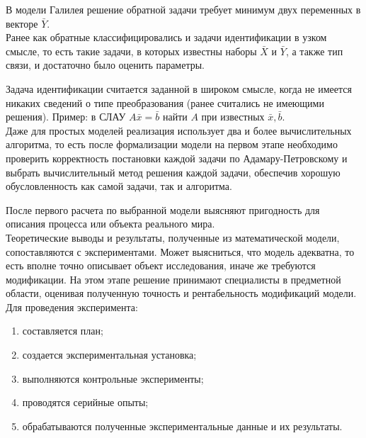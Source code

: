 \documentclass[12pt]{article}
\begin{document}
В модели Галилея решение обратной задачи требует минимум двух переменных в векторе $\bar{Y}$.\\

Ранее как обратные классифицировались и задачи идентификации в узком смысле, то есть такие задачи, в которых известны наборы $\bar{X}$ и $\bar{Y}$, а также тип связи, и достаточно было оценить параметры.

Задача идентификации считается заданной в широком смысле, когда не имеется никаких сведений о типе преобразования (ранее считались не имеющими решения). Пример: в СЛАУ $A\bar{x} = \bar{b}$ найти $A$ при известных $\bar{x}, \bar{b}$.\\


Даже для простых моделей реализация использует два и более вычислительных алгоритма, то есть после формализации модели на первом этапе необходимо проверить корректность постановки каждой задачи по Адамару-Петровскому и выбрать вычислительный метод решения каждой задачи, обеспечив хорошую обусловленность как самой задачи, так и алгоритма.

После первого расчета по выбранной модели выясняют пригодность для описания процесса или объекта реального мира.\\

Теоретические выводы и результаты, полученные из математической модели, сопоставляются с экспериментами. Может выясниться, что модель адекватна, то есть вполне точно описывает объект исследования, иначе же требуются модификации. На этом этапе решение принимают специалисты в предметной области, оценивая полученную точность и рентабельность модификаций модели.\\

Для проведения эксперимента:
\begin{enumerate}
    \item составляется план;
    \item создается экспериментальная установка;
    \item выполняются контрольные эксперименты;
    \item проводятся серийные опыты;
    \item обрабатываются полученные экспериментальные данные и их результаты.
\end{enumerate}
\end{document}
